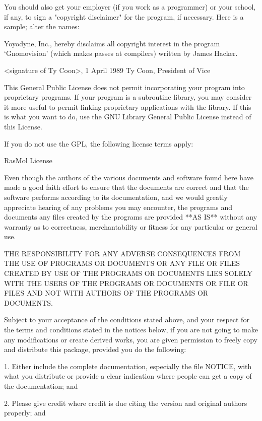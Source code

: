 You should also get your employer (if you work as a programmer) or your
school, if any, to sign a "copyright disclaimer" for the program, if
necessary.  Here is a sample; alter the names:

  Yoyodyne, Inc., hereby disclaims all copyright interest in the program
  `Gnomovision' (which makes passes at compilers) written by James Hacker.

  <signature of Ty Coon>, 1 April 1989
  Ty Coon, President of Vice

This General Public License does not permit incorporating your program into
proprietary programs.  If your program is a subroutine library, you may
consider it more useful to permit linking proprietary applications with the
library.  If this is what you want to do, use the GNU Library General
Public License instead of this License.

If you do not use the GPL, the following license terms apply:

RasMol License

Even though the authors of the various documents and software found here
have made a good faith effort to ensure that the documents are correct and
that the software performs according to its documentation, and we would
greatly appreciate hearing of any problems you may encounter, the programs
and documents any files created by the programs are provided **AS IS**
without any warranty as to correctness, merchantability or fitness for any
particular or general use.

THE RESPONSIBILITY FOR ANY ADVERSE CONSEQUENCES FROM THE USE OF PROGRAMS OR
DOCUMENTS OR ANY FILE OR FILES CREATED BY USE OF THE PROGRAMS OR DOCUMENTS
LIES SOLELY WITH THE USERS OF THE PROGRAMS OR DOCUMENTS OR FILE OR FILES AND
NOT WITH AUTHORS OF THE PROGRAMS OR DOCUMENTS.

Subject to your acceptance of the conditions stated above, and your respect
for the terms and conditions stated in the notices below, if you are not
going to make any modifications or create derived works, you are given
permission to freely copy and distribute this package, provided you do the
following:

  1.  Either include the complete documentation, especially the file
NOTICE, with what you distribute or provide a clear indication where
people can get a copy of the documentation; and

  2.  Please give credit where credit is due citing the version and
original authors properly; and

